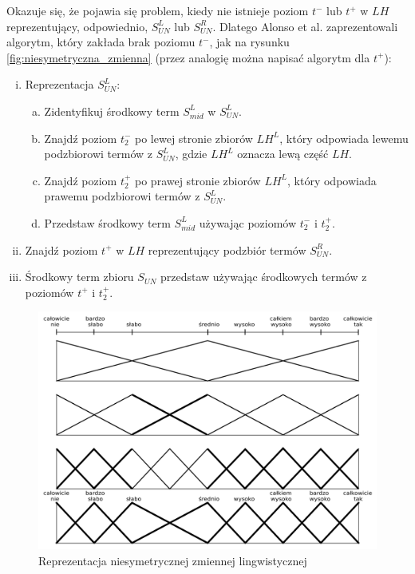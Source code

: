 Okazuje się, że pojawia się problem, kiedy nie istnieje poziom $t^-$ lub $t^+$ w
$LH$ reprezentujący, odpowiednio, $S^L_{UN}$ lub $S^R_{UN}$. Dlatego Alonso et
al. zaprezentowali algorytm, który zakłada brak poziomu $t^-$, jak na rysunku
\ref{fig:niesymetryczna_zmienna} (przez analogię można napisać algorytm dla
$t^+$):
\begin{enumerate}[i.]
  \item Reprezentacja $S^L_{UN}\colon$
  \begin{enumerate}[(a)]
    \item Zidentyfikuj środkowy term $S^L_{mid}$ w $S^L_{UN}$.
    \item Znajdź poziom $t^-_2$ po lewej stronie zbiorów $LH^L$, który odpowiada
    lewemu podzbiorowi termów z $S^L_{UN}$, gdzie $LH^L$ oznacza lewą część
    $LH$.
    \item Znajdź poziom $t^+_2$ po prawej stronie zbiorów $LH^L$, który
    odpowiada prawemu podzbiorowi termów z $S^L_{UN}$.
    \item Przedstaw środkowy term $S^L_{mid}$ używając poziomów $t^-_2$ i
    $t^+_2$.
  \end{enumerate}
  \item Znajdź poziom $t^+$ w $LH$ reprezentujący podzbiór termów $S^R_{UN}$.
  \item Środkowy term zbioru $S_{UN}$ przedstaw używając środkowych termów z
  poziomów $t^+$ i $t^+_2$.
\end{enumerate}
\begin{figure}[ht]
  \includegraphics[width=\linewidth]
    {chapters/preferences/hierarchia_lingwistyczna_przyklad}
  \caption{Reprezentacja niesymetrycznej zmiennej lingwistycznej}
  \label{fig:hierarchia_lingwistyczna_przyklad}
\end{figure}
